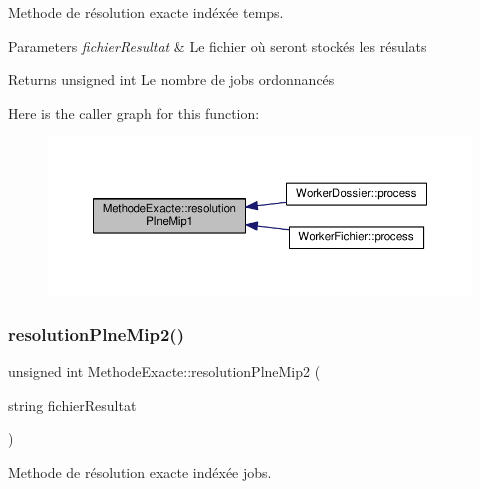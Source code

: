 Methode de résolution exacte indéxée temps. 


\begin{DoxyParams}{Parameters}
{\em fichier\+Resultat} & Le fichier où seront stockés les résulats \\
\hline
\end{DoxyParams}
\begin{DoxyReturn}{Returns}
unsigned int Le nombre de jobs ordonnancés 
\end{DoxyReturn}
Here is the caller graph for this function\+:\nopagebreak
\begin{figure}[H]
\begin{center}
\leavevmode
\includegraphics[width=350pt]{classMethodeExacte_a91443b3ea749912772b40b5b5c40379e_icgraph}
\end{center}
\end{figure}
\mbox{\label{classMethodeExacte_a3163e487cc9e99ee7667d1dd146edb4b}} 
\subsubsection{\texorpdfstring{resolution\+Plne\+Mip2()}{resolutionPlneMip2()}}
{\footnotesize\ttfamily unsigned int Methode\+Exacte\+::resolution\+Plne\+Mip2 (\begin{DoxyParamCaption}\item[{string}]{fichier\+Resultat }\end{DoxyParamCaption})}



Methode de résolution exacte indéxée jobs. 


